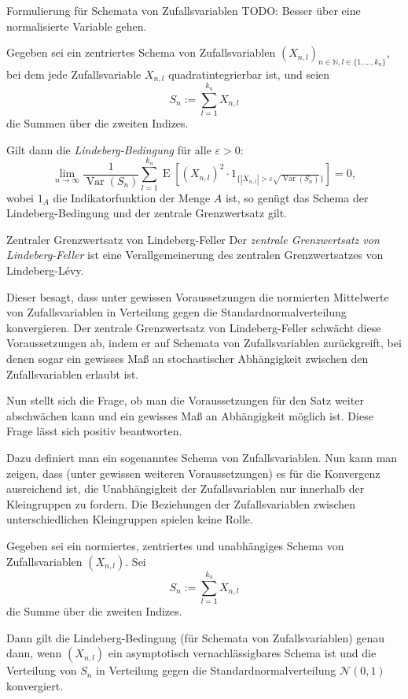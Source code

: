 \begin{defi}{Formulierung für Schemata von Zufallsvariablen}
    TODO: Besser über eine normalisierte Variable gehen.

    Gegeben sei ein zentriertes Schema von Zufallsvariablen $(X_{n,l})_{n \in \mathbb{N}, l \in \{1, \ldots, k_n\}}$, bei dem jede Zufallsvariable $X_{n,l}$ quadratintegrierbar ist, und seien
    \[
        S_n := \sum_{l=1}^{k_n} X_{n,l}
    \]
    die Summen über die zweiten Indizes.

    Gilt dann die \emph{Lindeberg-Bedingung} für alle $\varepsilon > 0$:
    \[
        \lim_{n \to \infty} \frac{1}{\operatorname{Var}(S_n)} \sum_{l=1}^{k_n} \operatorname{E} \left[ \left( X_{n,l} \right)^2 \cdot 1_{\{|X_{n,l}| > \varepsilon \sqrt{\operatorname{Var}(S_n)}\}} \right] = 0,
    \]
    wobei $1_{A}$ die Indikatorfunktion der Menge $A$ ist, so genügt das Schema der Lindeberg-Bedingung und der zentrale Grenzwertsatz gilt.
\end{defi}

\begin{defi}{Zentraler Grenzwertsatz von Lindeberg-Feller}
    Der \emph{zentrale Grenzwertsatz von Lindeberg-Feller} ist eine Verallgemeinerung des zentralen Grenzwertsatzes von Lindeberg-Lévy.

    Dieser besagt, dass unter gewissen Voraussetzungen die normierten Mittelwerte von Zufallsvariablen in Verteilung gegen die Standardnormalverteilung konvergieren.
    Der zentrale Grenzwertsatz von Lindeberg-Feller schwächt diese Voraussetzungen ab, indem er auf Schemata von Zufallsvariablen zurückgreift, bei denen sogar ein gewisses Maß an stochastischer Abhängigkeit zwischen den Zufallsvariablen erlaubt ist.

    Nun stellt sich die Frage, ob man die Voraussetzungen für den Satz weiter abschwächen kann und ein gewisses Maß an Abhängigkeit möglich ist.
    Diese Frage lässt sich positiv beantworten.

    Dazu definiert man ein sogenanntes Schema von Zufallsvariablen.
    Nun kann man zeigen, dass (unter gewissen weiteren Voraussetzungen) es für die Konvergenz ausreichend ist, die Unabhängigkeit der Zufallsvariablen nur innerhalb der Kleingruppen zu fordern.
    Die Beziehungen der Zufallsvariablen zwischen unterschiedlichen Kleingruppen spielen keine Rolle.

    Gegeben sei ein normiertes, zentriertes und unabhängiges Schema von Zufallsvariablen $(X_{n,l})$.
    Sei
    \[
        S_n := \sum_{l=1}^{k_n} X_{n,l}
    \]
    die Summe über die zweiten Indizes.

    Dann gilt die Lindeberg-Bedingung (für Schemata von Zufallsvariablen) genau dann, wenn $(X_{n,l})$ ein asymptotisch vernachlässigbares Schema ist und die Verteilung von $S_n$ in Verteilung gegen die Standardnormalverteilung $\mathcal{N}(0, 1)$ konvergiert.
\end{defi}

